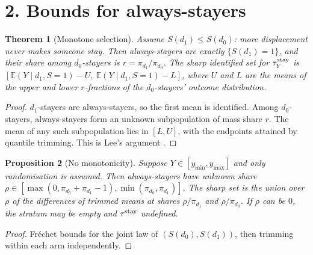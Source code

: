 \documentclass[11pt]{article}
\newtheorem{theorem}{Theorem}
\newtheorem{proposition}[theorem]{Proposition}
\theoremstyle{definition}
\begin{document}
\section*{2. Bounds for always-stayers}
\begin{theorem}[Monotone selection]\label{thm:lee}
Assume $S(d_1)\le S(d_0)$: more displacement never makes someone stay. Then always-stayers are exactly
$\{S(d_1)=1\}$, and their share among $d_0$-stayers is $r=\pi_{d_1}/\pi_{d_0}$. The sharp identified set for
$\tau^{\rm stay}_Y$ is $[\mathbb E(Y\mid d_1,S=1)-U,\ \mathbb E(Y\mid d_1,S=1)-L]$, where $U$ and $L$ are the means of the
upper and lower $r$-fractions of the $d_0$-stayers' outcome distribution.
\end{theorem}
\begin{proof}
$d_1$-stayers are always-stayers, so the first mean is identified. Among $d_0$-stayers, always-stayers form an unknown
subpopulation of mass share $r$. The mean of any such subpopulation lies in $[L,U]$, with the endpoints attained by
quantile trimming. This is Lee's argument \cite{lee}.
\end{proof}
\begin{proposition}[No monotonicity]\label{prop:nomono}
Suppose $Y\in[y_{\min},y_{\max}]$ and only randomisation is assumed. Then always-stayers have unknown share
$\rho\in[\max(0,\pi_{d_0}+\pi_{d_1}-1),\min(\pi_{d_0},\pi_{d_1})]$. The sharp set is the union over $\rho$ of the
differences of trimmed means at shares $\rho/\pi_{d_1}$ and $\rho/\pi_{d_0}$. If $\rho$ can be $0$, the stratum may be
empty and $\tau^{\rm stay}$ undefined.
\end{proposition}
\begin{proof}
Fr\'echet bounds for the joint law of $(S(d_0),S(d_1))$, then trimming within each arm independently.
\end{proof}
\end{document}
